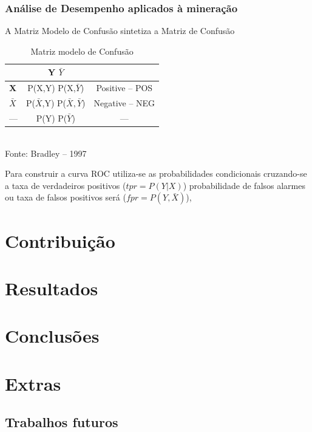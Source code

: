 \documentclass[11pt]{beamer}
\begin{document}
\begin{frame}\frametitle{ Análise de Desempenho aplicados à mineração}
	
	A Matriz Modelo de Confusão sintetiza a Matriz de Confusão
\begin{table}[ht]
	\centering
	\caption{Matriz modelo de Confusão}
	\vspace{1mm}
	\begin{tabular}{l|c|c}
		\hline
		\textbf{}           & \textbf{Y}     \textbf{$\bar{Y}$}   & \textbf{}\\
		\hline
		\textbf{X}          & P(X,Y)         P(X,$\bar{Y}$)       & Positive -- POS\\
		\textbf{$\bar{X}$}  & P($\bar{X}$,Y) P($\bar{X},\bar{Y}$) & Negative -- NEG\\
		\hline
		---              & P(Y)           P($\bar{Y}$)         &     ---        \\
	\end{tabular}
	\\
	\tiny Fonte: Bradley -- 1997
\end{table}

 Para construir a curva ROC utiliza-se as probabilidades condicionais cruzando-se a taxa de verdadeiros positivos ($ tpr = P(Y|X)$) probabilidade de falsos alarmes ou taxa de falsos positivos será ($ fpr = P(Y,\bar{X})$),
 
 
\end{frame}

\section{Contribuição}


\section{Resultados}

\section{Conclusões}

\section{Extras}
\subsection{Trabalhos futuros}
\end{document}
